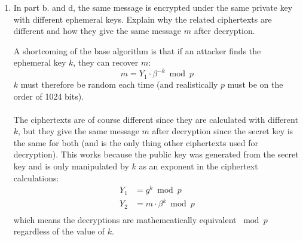\documentclass[12pt]{article}
\newenvironment{answer}
{ \begin{tcolorbox}[halign=left]
    }
    {  
  \end{tcolorbox}
}
\begin{document}
\begin{enumerate}
\begin{enumerate}
\begin{answer}
\begin{align*}
      \end{align*}
      \begin{align*}
        &s_0: \text{  }971 = \bm{1}(730) + 241 &p_0 &= 0 \text{ (given)}\\
        &s_1: \text{  }730 = \bm{3}(241) + 7 &p_1 &= 1 \text{ (given)}\\
        &s_2: \text{  }241 = \bm{34}(7) + 3 &p_2 &= p_0 - p_1(q_0) \bmod 971 \\ 
        & & &= 0 - 1(1) \bmod 971 = 970 \\
      \end{align*}
      \begin{center}
        (next page)
      \end{center}
    \end{answer}
    \begin{answer}
      \begin{align*}
        &s_3: \text{  }7 = \bm{2}(3) + 1 &p_3 &= p_1 - p_2(q_1) \bmod 971 \\
        & & &= 1 - 970(3) \bmod 971 = 4 \\
        &s_4: \text{  }3 = \bm{3}(1) + 0 &p_4 &= p_2 - p_3(q_2) \bmod 971 \\
        & & &= 970 - 4(34) \bmod 971 = 834 \\
        & &p_5 &= p_3 - p_4(q_3) \bmod 971 \\
        & & &= 4 - 834(2) \bmod 971 = \bm{278} \\
      \end{align*}
      \[ m = 821 \cdot (278)^{23} \bmod 971 = 49\]
    \end{answer}
  \item In part b. and d, the same message is encrypted under the same private key with different ephemeral keys. Explain why the related ciphertexts are different and how they give the same message $m$ after decryption.
    \begin{answer}
      A shortcoming of the base algorithm is that if an attacker finds the ephemeral key $k$, they can recover $m$:
      \[ m = Y_1 \cdot \beta^{-k} \bmod p\]
      $k$ must therefore be random each time (and realistically $p$ must be on the order of 1024 bits).
      \\~\\
      The ciphertexts are of course different since they are calculated with different $k$, but they give the same message $m$ after decryption since the secret key is the same for both (and is the only thing other ciphertexts used for decryption). This works because the public key was generated from the secret key and is only manipulated by $k$ as an exponent in the ciphertext calculations:
      \begin{align*}
        Y_1 &= g^k \bmod p \\
        Y_2 &= m \cdot \beta^k \bmod p \\
      \end{align*}
      which means the decryptions are mathemcatically equivalent $\bmod p$ regardless of the value of $k$.      


\end{answer}
\end{enumerate}
\end{enumerate}
\end{document}

